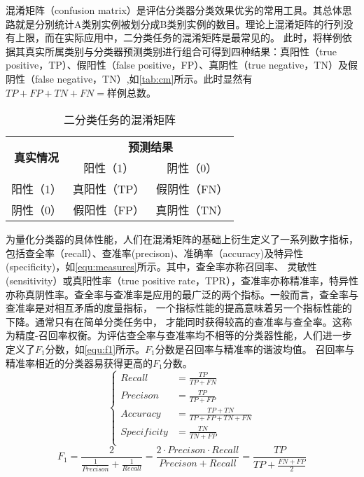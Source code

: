 混淆矩阵（confusion matrix）是评估分类器分类效果优劣的常用工具\cite{Zhou2016,Aurélien2018}。其总体思路就是分别统计A类别实例被划分成B类别实例的数目。理论上混淆矩阵的行列没有上限，而在实际应用中，二分类任务的混淆矩阵是最常见的。
此时，将样例依据其真实所属类别与分类器预测类别进行组合可得到四种结果：真阳性（true positive，TP）、假阳性（false positive，FP）、真阴性（true negative，TN）及假阴性（false negative，TN）,如\autoref{tab:cm}所示。此时显然有
$TP+FP+TN+FN=\text{样例总数}$。
\begin{table}[htbp]
      \centering
      \caption{\label{tab:cm}二分类任务的混淆矩阵}
      \begin{tabular}{ccc}
      \toprule
      \multicolumn{1}{c}{\multirow{2}[4]{*}{\textbf{真实情况}}} & \multicolumn{2}{c}{\textbf{预测结果}} \\
            \cmidrule{2-3}          & 阳性（1） & 阴性（0） \\
      \midrule
      阳性（1） & 真阳性（TP） & 假阴性（FN） \\
      阴性（0） & 假阳性（FP） & 真阴性（TN） \\
      \bottomrule
      \end{tabular}%
\end{table}%

为量化分类器的具体性能，人们在混淆矩阵的基础上衍生定义了一系列数字指标，包括查全率（recall）、查准率(precison)、准确率（accuracy)及特异性(specificity)，如\autoref{equ:measures}所示。其中，查全率亦称召回率、
灵敏性(sensitivity）或真阳性率（true positive rate，TPR），查准率亦称精准率，特异性亦称真阴性率。查全率与查准率是应用的最广泛的两个指标\cite{Zhou2016,Aurélien2018}。一般而言，查全率与查准率是对相互矛盾的度量指标，
一个指标性能的提高意味着另一个指标性能的下降。通常只有在简单分类任务中，
才能同时获得较高的查准率与查全率。这称为精度-召回率权衡。为评估查全率与查准率均不相等的分类器性能，人们进一步定义了$F_1\text{分数}$，如\autoref{equ:f1}所示。$F_1\text{分数}$是召回率与精准率的谐波均值。
召回率与精准率相近的分类器易获得更高的$F_1\text{分数}$。
\begin{equation}
      \label{equ:measures}
      \left \{
      \begin{aligned}
            Recall      &=\frac{TP}{TP+FN}         \\
            Precison    &=\frac{TP}{TP+FP}          \\
            Accuracy    &=\frac{TP+TN}{TP+FP+TN+FN} \\
            Specificity &=\frac{TN}{TN+FP}       \\
      \end{aligned}
      \right.
\end{equation}
\begin{equation}
      \label{equ:f1}
      F_1=\frac{2}{\frac{1}{Precison}+\frac{1}{Recall}}=\frac{2\cdot Precison\cdot Recall}{Precison+Recall}=\frac{TP}{TP+\frac{FN+FP}{2}}
\end{equation}

